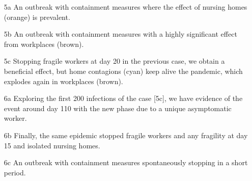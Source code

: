\documentclass[graybox]{svmult}
\begin{document}
\begin{itemize}
\item [5a] An outbreak with containment measures where the effect of nursing homes (orange) is prevalent.
\item [5b] An outbreak with containment measures with a highly significant effect from workplaces (brown).
\item [5c] Stopping fragile workers at day 20 in the previous case, we obtain a beneficial effect, but home contagions (cyan) keep alive the pandemic, which explodes again in workplaces (brown).

\item [6a] Exploring the first 200 infections of the case [5c], we have evidence of the event around day 110 with the new phase due to a unique asymptomatic worker.
\item [6b] Finally, the same epidemic stopped fragile workers and any fragility at day 15 and isolated nursing homes.
\item [6c] An outbreak with containment measures spontaneously stopping in a short period.
\end{itemize}
\end{document}
